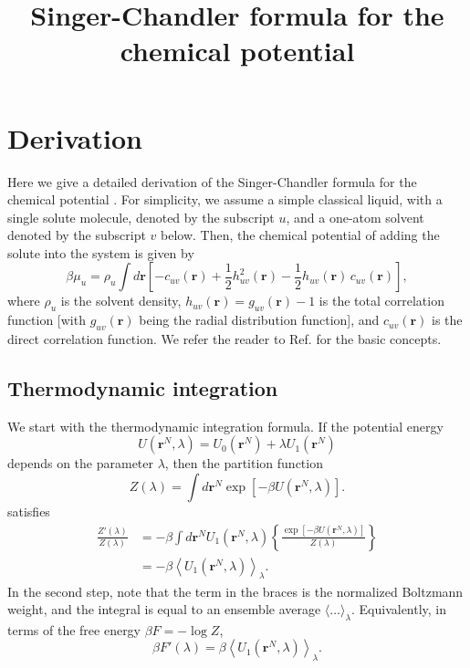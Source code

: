 \documentclass[12pt]{article}
\begin{document}
\newcommand{\vct}[1]{\mathbf{#1}}
\newcommand{\vr}{\vct{r}}
\newcommand{\vrN}{\mathbf{r}^N}
\newcommand{\vrn}{\mathbf{r}^n}
\newcommand{\plam}{\partial_\lambda}



\title{Singer-Chandler formula for the chemical potential}
\date{}
\maketitle



\section{Derivation}

Here we give a detailed derivation of the Singer-Chandler formula
  for the chemical potential \cite{singer}.
For simplicity, we assume a simple classical liquid,
  with a single solute molecule, denoted by the subscript $u$,
  and a one-atom solvent denoted by the subscript $v$ below.
Then, the chemical potential of adding the solute into
  the system is given by
%
\begin{equation}
\beta \mu_u
  =
  \rho_u \int d\vr
  \left[
    - c_{uv}(\vr)
    + \frac{1}{2} h_{uv}^2(\vr)
    - \frac{1}{2} h_{uv}(\vr) \, c_{uv}(\vr)
  \right],
  \label{eq:singer}
\end{equation}
%
where $\rho_u$ is the solvent density,
  $h_{uv}(\vr) = g_{uv}(\vr) - 1$ is the total correlation function
  [with $g_{uv}(\vr)$ being the radial distribution function],
and $c_{uv}(\vr)$ is the direct correlation function.
We refer the reader to Ref. \cite{hansen}
  for the basic concepts.
%



\subsection{Thermodynamic integration}

We start with the thermodynamic integration formula.
If the potential energy
\[
  U(\vrN, \lambda) = U_0(\vrN) + \lambda U_1(\vrN)
\]
depends on the parameter $\lambda$,
then the partition function
\[
  Z(\lambda) = \int d\vrN \exp[-\beta U(\vrN, \lambda)].
\]
satisfies
\begin{align*}
  \frac{ Z'(\lambda) }{Z(\lambda)}
  &=
    -\beta \int d\vrN U_1(\vrN, \lambda)
    \left\{
      \frac{ \exp
             \left[
             -\beta U(\vrN, \lambda)
             \right]}
      { Z(\lambda) }
    \right\} \\
  &=
    -\beta
    \left\langle
      U_1(\vrN, \lambda)
    \right\rangle_\lambda.
\end{align*}
In the second step, note that the term in the braces
  is the normalized Boltzmann weight,
  and the integral is equal to an ensemble average
  $\langle \dots \rangle_\lambda$.
%
Equivalently, in terms of the free energy $\beta F = -\log Z$,
\begin{equation}
  \beta F'(\lambda)
  = \beta
    \left\langle
      U_1(\vrN, \lambda)
    \right\rangle_\lambda.
\end{equation}
\end{document}
